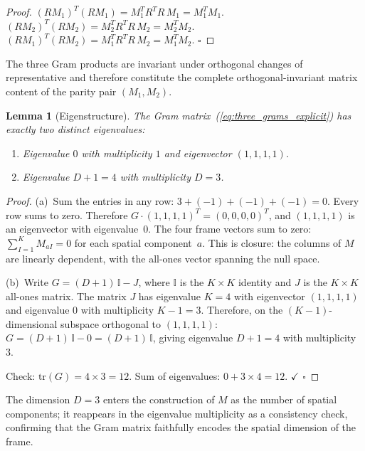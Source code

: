 \documentclass[twocolumn]{iopjournal}
\newtheorem{lemma}{Lemma}
\theoremstyle{definition}
\begin{document}
\begin{proof}
$(RM_1)^T(RM_1) = M_1^T R^T R\,M_1 = M_1^T M_1$.
$(RM_2)^T(RM_2) = M_2^T R^T R\,M_2 = M_2^T M_2$.
$(RM_1)^T(RM_2) = M_1^T R^T R\,M_2 = M_1^T M_2$.
\hfill$\square$
\end{proof}

\noindent
The three Gram products are invariant under orthogonal changes of
representative and therefore constitute the complete
orthogonal-invariant matrix content of the parity pair $(M_1, M_2)$.

\begin{lemma}[Eigenstructure]
\label{lem:eigen}
The Gram matrix~(\ref{eq:three_grams_explicit}) has exactly two distinct
eigenvalues:
\begin{enumerate}
\item[(a)] Eigenvalue $0$ with multiplicity $1$ and eigenvector
  $(1,1,1,1)$.
\item[(b)] Eigenvalue $D + 1 = 4$ with multiplicity $D = 3$.
\end{enumerate}
\end{lemma}

\begin{proof}
(a)~Sum the entries in any row: $3 + (-1) + (-1) + (-1) = 0$.  Every
row sums to zero.  Therefore $G \cdot (1,1,1,1)^T = (0,0,0,0)^T$, and
$(1,1,1,1)$ is an eigenvector with eigenvalue~$0$.  The four frame
vectors sum to zero: $\sum_{I=1}^{K} M_{aI} = 0$ for each spatial
component~$a$.  This is closure: the columns of $M$ are linearly
dependent, with the all-ones vector spanning the null space.

(b)~Write $G = (D+1)\,\mathbb{I} - J$, where $\mathbb{I}$ is the
$K \times K$ identity and $J$ is the $K \times K$ all-ones matrix.  The
matrix $J$ has eigenvalue $K = 4$ with eigenvector $(1,1,1,1)$ and
eigenvalue $0$ with multiplicity $K - 1 = 3$.  Therefore, on the
$(K-1)$-dimensional subspace orthogonal to $(1,1,1,1)$:
$G = (D+1)\,\mathbb{I} - 0 = (D+1)\,\mathbb{I}$, giving eigenvalue
$D + 1 = 4$ with multiplicity~$3$.

Check: $\mathrm{tr}(G) = 4 \times 3 = 12$.  Sum of eigenvalues:
$0 + 3 \times 4 = 12$.  $\checkmark$ \hfill$\square$
\end{proof}

\noindent
The dimension $D = 3$ enters the construction of $M$ as the number of
spatial components; it reappears in the eigenvalue multiplicity as a
consistency check, confirming that the Gram matrix faithfully encodes the
spatial dimension of the frame.
\end{document}
